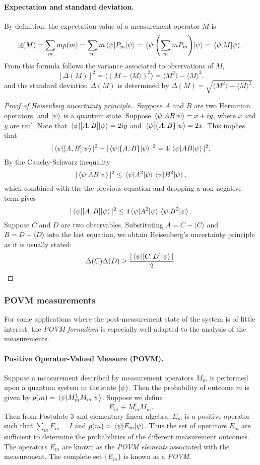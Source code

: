 \documentclass{article}
\numberwithin{theorem}{section}
\numberwithin{corollary}{section}
\numberwithin{postulate}{section}
\DeclareMathOperator{\E}{\mathbb{E}}
\begin{document}
\paragraph{Expectation and standard deviation.} By definition, the expectation
value of a measurement operator $M$ is \[
  \E(M) = \sum_m mp(m) = \sum_m m\ev{P_m}{\psi} =
  \ev{\left(\sum_m mP_m\right)}{\psi} = \ev{M}{\psi}.
\] From this formula follows the variance associated to observations of $M$, \[
  [\Delta(M)]^2 = \langle (M - \langle M \rangle)^2 \rangle =
  \langle M^2 \rangle - \langle M \rangle^2.
\] and the standard deviation $\Delta(M)$ is determined by $\Delta(M) =
\sqrt{\langle M^2 \rangle - \langle M \rangle^2}$.

\begin{proof}[Proof of Heisenberg uncertainty principle.]
  Suppose $A$ and $B$ are two Hermitian operators, and $\ket{\psi}$ is a
  quantum state. Suppose $\ev{AB}{\psi} = x + iy$, where $x$ and $y$ are real.
  Note that $\ev{[A, B]}{\psi} = 2iy$ and $\ev{\{A, B\}}{\psi} = 2x$. This
  implies that \[
    |\ev{[A, B]}{\psi}|^2 + |\ev{\{A, B\}}{\psi}|^2 = 4|\ev{AB}{\psi}|^2.
  \] By the Cauchy-Schwarz inequality \[
    |\ev{AB}{\psi}|^2 \leq \ev{A^2}{\psi}\ev{B^2}{\psi},
  \] which combined with the the previous equation and dropping a non-negative
  term gives \[
    |\ev{[A, B]}{\psi}|^2 \leq 4\ev{A^2}{\psi}\ev{B^2}{\psi}.
  \] Suppose $C$ and $D$ are two observables. Substituting $A = C -
  \langle C \rangle$ and $B = D - \langle D \rangle$ into the last equation, we
  obtain Heisenberg's uncertainty principle as it is usually stated: \[
    \Delta(C)\Delta(D) \geq \frac{|\ev{[C, D]}{\psi}|}{2}.
  \]
\end{proof}

\subsubsection{POVM measurements}

For some applications where the post-measurement state of the system is of
little interest, the \emph{POVM formalism} is especially well adapted to the
analysis of the measurements.

\paragraph{Positive Operator-Valued Measure (POVM).} Suppose a measurement
described by measurement operators $M_m$ is performed upon a quantum system in
the state $\ket{\psi}$. Then the probability of outcome $m$ is given by $p(m) =
\ev{M_m^{\dagger}M_m}{\psi}$. Suppose we define \[
  E_m \equiv M_m^{\dagger}M_m.
\] Then from Postulate 3 and elementary linear algebra, $E_m$ is a positive
operator such that $\sum_m E_m = I$ and $p(m) = \ev{E_m}{\psi}$. Thus the set
of operators $E_m$ are sufficient to determine the probabilities of the
different measurement outcomes. The operators $E_m$ are known as the \emph{POVM
elements} associated with the measurement. The complete set $\{E_m\}$ is known
as a \emph{POVM}.
\end{document}
